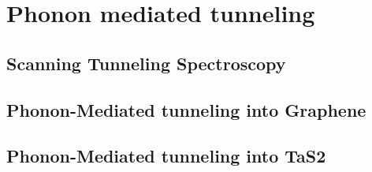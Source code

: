\documentclass[main.tex]{subfiles}
\begin{document}
\chapter{Phonon mediated tunneling }

\section{Scanning Tunneling Spectroscopy}

\section{Phonon-Mediated tunneling into Graphene}

\section{Phonon-Mediated tunneling into TaS2}
\end{document}
